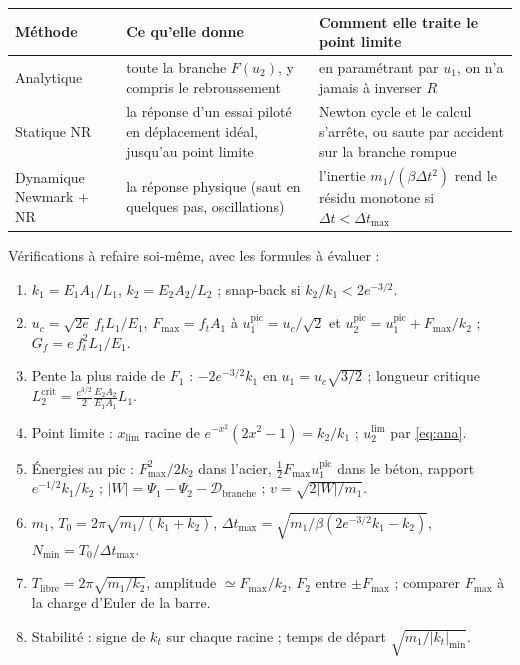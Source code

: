 \documentclass[11pt,a4paper]{article}
\newcommand{\uc}{u_c}
\begin{document}
\begin{center}
\begin{tabular}{@{}p{3.2cm}p{5.4cm}p{6.2cm}@{}}
\toprule
Méthode & Ce qu'elle donne & Comment elle traite le point limite\\
\midrule
Analytique & toute la branche $F(u_2)$, y compris le rebroussement & en paramétrant par $u_1$, on n'a jamais à inverser $R$\\
Statique NR & la réponse d'un essai piloté en déplacement idéal, jusqu'au point limite & Newton cycle et le calcul s'arrête, ou saute par accident sur la branche rompue\\
Dynamique Newmark + NR & la réponse physique (saut en quelques pas, oscillations) & l'inertie $m_1/(\beta\Delta t^2)$ rend le résidu monotone si $\Delta t < \Delta t_{\max}$\\
\bottomrule
\end{tabular}
\end{center}

\begin{alamain}
Vérifications à refaire soi-même, avec les formules à évaluer :
\begin{enumerate}[nosep]
  \item $k_1 = E_1A_1/L_1$, $k_2 = E_2A_2/L_2$ ; snap-back si $k_2/k_1 < 2e^{-3/2}$.
  \item $\uc = \sqrt{2e}\,f_tL_1/E_1$, $F_{\max} = f_tA_1$ à $u_1^{\text{pic}} = \uc/\sqrt2$ et
        $u_2^{\text{pic}} = u_1^{\text{pic}} + F_{\max}/k_2$ ; $G_f = e\,f_t^2L_1/E_1$.
  \item Pente la plus raide de $F_1$ : $-2e^{-3/2}k_1$ en $u_1 = \uc\sqrt{3/2}$ ; longueur critique
        $L_2^{\text{crit}} = \tfrac{e^{3/2}}{2}\tfrac{E_2A_2}{E_1A_1}L_1$.
  \item Point limite : $x_{\lim}$ racine de $e^{-x^2}(2x^2-1) = k_2/k_1$ ; $u_2^{\lim}$ par \eqref{eq:ana}.
  \item Énergies au pic : $F_{\max}^2/2k_2$ dans l'acier, $\tfrac12F_{\max}u_1^{\text{pic}}$ dans le béton,
        rapport $e^{-1/2}k_1/k_2$ ; $|W| = \Psi_1-\Psi_2-\mathcal D_{\text{branche}}$ ; $v = \sqrt{2|W|/m_1}$.
  \item $m_1$, $T_0 = 2\pi\sqrt{m_1/(k_1+k_2)}$, $\Delta t_{\max} = \sqrt{m_1/\beta(2e^{-3/2}k_1-k_2)}$,
        $N_{\min} = T_0/\Delta t_{\max}$.
  \item $T_{\text{libre}} = 2\pi\sqrt{m_1/k_2}$, amplitude $\simeq F_{\max}/k_2$, $F_2$ entre $\pm F_{\max}$ ;
        comparer $F_{\max}$ à la charge d'Euler de la barre.
  \item Stabilité : signe de $k_t$ sur chaque racine ; temps de départ $\sqrt{m_1/|k_t|_{\min}}$.
\end{enumerate}
\end{alamain}
\end{document}

